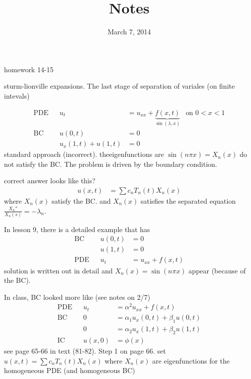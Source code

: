 \documentclass{article}
\begin{document}
\title{Notes}
\date{March 7, 2014}
\maketitle
homework 14-15

sturm-lionville expansions. The last stage of separation of variales (on finite intevals)

\begin{align*}
  \text{PDE}&&u_t&=u_{xx}+\underbrace{f(x,t)}_{\sin(\lambda,x)}&\text{on }0<x<1\\
  \text{BC}&&u(0,t)&=0\\
  &&u_x(1,t)+u(1,t)&=0
\end{align*}
standard approach (incorrect). theeigenfunctions are $\sin(n\pi x)=X_n(x)$ do not satisfy the BC. The problem is driven by the boundary condition.

correct answer looks like this?
\begin{align*}
  u(x,t)&=\sum\limits{c_nT_n(t)X_n(x)}
\end{align*}
where $X_n(x)$ satisfy the BC. and $X_n(x)$ satisfies the separated equation $\frac{{X_n}''}{X_n(s)}=-\lambda_n$.

In lesson 9, there is a detailed example that has
\begin{align*}
  \text{BC}&&u(0,t)&=0\\
  &&u(1,t)&=0\\
  \text{PDE}&&u_t&=u_{xx}+f(x,t)
\end{align*}
solution is written out in detail and $X_n(x)=\sin(n\pi x)$ appear (because of the BC).

In class, BC looked more like (see notes on 2/7)
\begin{align*}
  \text{PDE}&&u_t&=\alpha^2u_{xx}+f(x,t)\\
  \text{BC}&&0&=\alpha_1u_x(0,t)+\beta_1u(0,t)\\
  &&0&=\alpha_2u_x(1,t)+\beta_2u(1,t)\\
  \text{IC}&&u(x,0)&=\phi(x)
\end{align*}
see page 65-66 in text (81-82). Step 1 on page 66. set $u(x,t)=\sum\limits{c_nT_n(t)X_n(x)}$ where $X_n(x)$ are eigenfunctions for the homogeneous PDE (and homogeneous BC)
\end{document}
